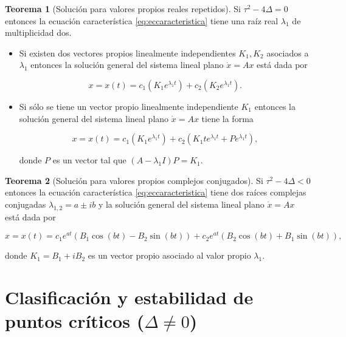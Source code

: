 \documentclass[11pt]{book}
\theoremstyle{definition}
\numberwithin{definition}{section}
\theoremstyle{theorem}
\newtheorem{theorem}{Teorema}
\numberwithin{theorem}{section}
\numberwithin{lemma}{section}
\numberwithin{corollary}{section}
\theoremstyle{plain}
\numberwithin{example}{section}
\begin{document}
\begin{theorem}[Solución para valores propios reales repetidos]Si $\tau^2 - 4\Delta = 0$ entonces la ecuación característica \ref{eq:eccaracteristica} tiene una raíz real $\lambda_1$ de multiplicidad dos.

\begin{itemize}

\item Si existen dos vectores propios linealmente independientes $K_1, K_2$ asociados a $\lambda_1$ entonces la solución general del sistema lineal plano $\dot{x} = Ax$ está dada por

\begin{equation} \label{eq:solvlrspropiosrepetidos1}
x = x(t) = c_1(K_1 e^{\lambda_1 t}) + c_2(K_2 e^{\lambda_1 t}).
\end{equation}

\item Si sólo se tiene un vector propio linealmente independiente $K_1$ entonces la solución general del sistema lineal plano $\dot{x} = Ax$ tiene la forma

\begin{equation} \label{eq:solvlrspropiosrepetidos2}
x = x(t) = c_1(K_1 e^{\lambda_1 t}) + c_2(K_1 t e^{\lambda_1 t} + Pe^{\lambda_1 t}),
\end{equation}

donde $P$ es un vector tal que $(A-\lambda_1I)P=K_1$.
\end{itemize}

\end{theorem}


\begin{theorem}[Solución para valores propios complejos conjugados]Si $\tau^2 - 4\Delta < 0$ entonces la ecuación característica \ref{eq:eccaracteristica} tiene dos raíces complejas conjugadas $\lambda_{1,2} = a \pm i b$ y la solución general del sistema lineal plano $\dot{x} = Ax$ está dada por

\begin{equation} \label{eq:solvlrspropioscomplejos}
x = x(t) = c_1 e^{a t}(B_1 \cos(bt) - B_2 \sin(bt)) + c_2 e^{a t}(B_2 \cos(bt) + B_1 \sin(bt)),
\end{equation}

donde $K_1 = B_1 + iB_2$ es un vector propio asociado al valor propio $\lambda_1$.
\end{theorem}

\section{Clasificación y estabilidad de puntos críticos ($\Delta \neq 0$)} \label{sec:estabilidadlineal}
\end{document}
